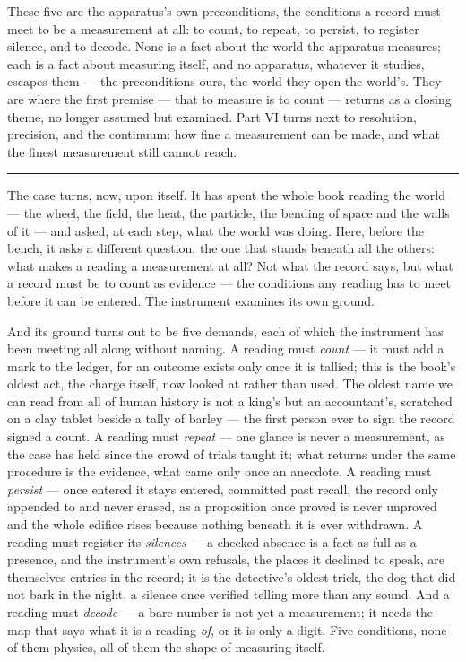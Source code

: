 \bigskip

These five are the apparatus's own preconditions, the conditions a record must meet to be a measurement at
all: to count, to repeat, to persist, to register silence, and to decode. None is a fact about the world the
apparatus measures; each is a fact about measuring itself, and no apparatus, whatever it studies, escapes them
--- the preconditions ours, the world they open the world's.
They are where the first premise --- that to measure is to count --- returns as a closing theme, no
longer assumed but examined. Part VI turns next to resolution, precision, and the continuum: how fine a
measurement can be made, and what the finest measurement still cannot reach.

\bigskip
\begin{center}
\rule{0.4\textwidth}{0.4pt}
\end{center}
\bigskip

\noindent The case turns, now, upon itself. It has spent the whole book reading the world --- the wheel, the
field, the heat, the particle, the bending of space and the walls of it --- and asked, at each step, what the
world was doing. Here, before the bench, it asks a different question, the one that stands beneath all the
others: what makes a reading a measurement at all? Not what the record says, but what a record must be to count
as evidence --- the conditions any reading has to meet before it can be entered. The instrument examines its own
ground.

And its ground turns out to be five demands, each of which the instrument has been meeting all along without
naming. A reading must \emph{count} --- it must add a mark to the ledger, for an outcome exists only once it is
tallied; this is the book's oldest act, the charge itself, now looked at rather than used. The oldest name we can read
from all of human history is not a king's but an accountant's, scratched on a clay tablet beside a tally of
barley --- the first person ever to sign the record signed a count. A reading must \emph{repeat} --- one glance
is never a measurement, as the case has held since the crowd of trials taught it; what returns under the same
procedure is the evidence, what came only once an anecdote. A reading must \emph{persist} --- once entered it
stays entered, committed past recall, the record only appended to and never erased, as a proposition once proved
is never unproved and the whole edifice rises because nothing beneath it is ever withdrawn. A reading must
register its \emph{silences} --- a checked absence is a fact as full as a presence, and the instrument's own
refusals, the places it declined to speak, are themselves entries in the record; it is the detective's oldest
trick, the dog that did not bark in the night, a silence once verified telling more than any sound. And a
reading must \emph{decode} --- a bare number is not yet a measurement; it needs the map that says what it is a
reading \emph{of}, or it is only a digit. Five conditions, none of them physics, all of them the shape of
measuring itself.

